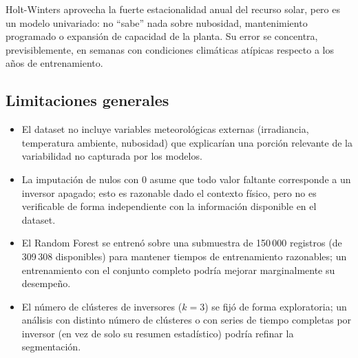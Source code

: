 Holt-Winters aprovecha la fuerte estacionalidad anual del recurso solar, pero es un modelo univariado: no ``sabe'' nada sobre nubosidad, mantenimiento programado o expansión de capacidad de la planta. Su error se concentra, previsiblemente, en semanas con condiciones climáticas atípicas respecto a los años de entrenamiento.

\subsection*{Limitaciones generales}

\begin{itemize}
    \item El dataset no incluye variables meteorológicas externas (irradiancia, temperatura ambiente, nubosidad) que explicarían una porción relevante de la variabilidad no capturada por los modelos.
    \item La imputación de nulos con 0 asume que todo valor faltante corresponde a un inversor apagado; esto es razonable dado el contexto físico, pero no es verificable de forma independiente con la información disponible en el dataset.
    \item El Random Forest se entrenó sobre una submuestra de 150\,000 registros (de 309\,308 disponibles) para mantener tiempos de entrenamiento razonables; un entrenamiento con el conjunto completo podría mejorar marginalmente su desempeño.
    \item El número de clústeres de inversores ($k=3$) se fijó de forma exploratoria; un análisis con distinto número de clústeres o con series de tiempo completas por inversor (en vez de solo su resumen estadístico) podría refinar la segmentación.
\end{itemize}
